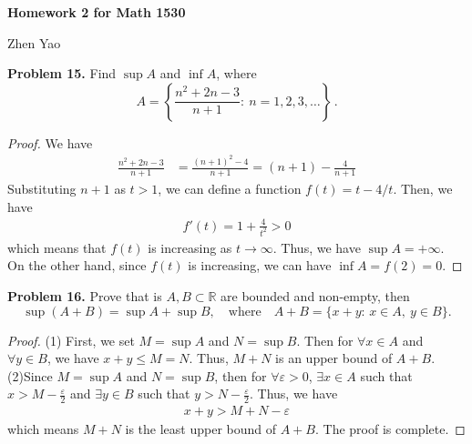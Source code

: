 \documentclass[12pt,leqno]{amsart}
\begin{document}
\centerline{\bf Homework 2 for Math 1530}
\centerline{Zhen Yao}







\bigskip


\medskip

\noindent
{\bf Problem 15.}
Find $\sup A$ and $\inf A$, where
$$
A=\left\{\frac{n^2+2n-3}{n+1}:\
n=1,2,3,\ldots\right\}\, .
$$

\begin{proof}
We have
\begin{align*}
    \frac{n^2+2n-3}{n+1} & = \frac{(n+1)^2 - 4}{n+1} =  (n+1) - \frac{4}{n+1}
\end{align*}
\hspace*{2em}Substituting $n+1$ as $t > 1$, we can define a function $f(t) = t - 4/t$. Then, we have
\begin{align*}
    f'(t) = 1 + \frac{4}{t^2} > 0
\end{align*}
which means that $f(t)$ is increasing as $t \rightarrow \infty$. Thus, we have $\sup A = +\infty$. \\
\hspace*{2em}On the other hand, since $f(t)$ is increasing, we can have $\inf A = f(2) = 0$.
\end{proof}


\noindent
{\bf Problem 16.}
Prove that is $A,B\subset\mathbb{R}$ are bounded and non-empty, then
$$
\sup(A+B)=\sup A +\sup B,
\quad
\text{where}
\quad
A+B=\{x+y:\, x\in A,\ y\in B\}.
$$
\begin{proof}
(1) First, we set $M = \sup A$ and $N = \sup B$. Then for $\forall x \in A$ and  $\forall y \in B$, we have $x + y \leq M = N$. Thus, $M + N$ is an upper bound of $A+B$.\\
\hspace*{2em}(2)Since $M = \sup A$ and $N = \sup B$, then for $\forall \varepsilon > 0$, $\exists x \in A$ such that $x > M - \frac{\varepsilon}{2}$ and $\exists y \in B$ such that $y > N - \frac{\varepsilon}{2}$. Thus, we have
\begin{align*}
    x + y > M + N - \varepsilon
\end{align*}
which means $M + N$ is the least upper bound of $A + B$. The proof is complete.
\end{proof}
\end{document}
